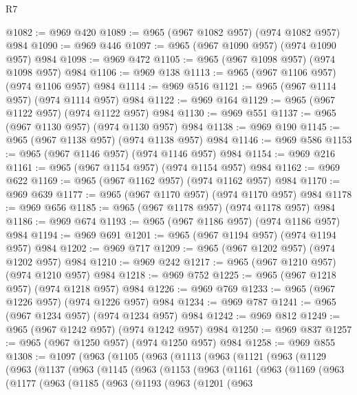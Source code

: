 \begin{lexlean}{R7}
\begin{coremodule}
@1082 := @969 @420
@1089 := @965 (@967 @1082 @957) (@974 @1082 @957) @984
@1090 := @969 @446
@1097 := @965 (@967 @1090 @957) (@974 @1090 @957) @984
@1098 := @969 @472
@1105 := @965 (@967 @1098 @957) (@974 @1098 @957) @984
@1106 := @969 @138
@1113 := @965 (@967 @1106 @957) (@974 @1106 @957) @984
@1114 := @969 @516
@1121 := @965 (@967 @1114 @957) (@974 @1114 @957) @984
@1122 := @969 @164
@1129 := @965 (@967 @1122 @957) (@974 @1122 @957) @984
@1130 := @969 @551
@1137 := @965 (@967 @1130 @957) (@974 @1130 @957) @984
@1138 := @969 @190
@1145 := @965 (@967 @1138 @957) (@974 @1138 @957) @984
@1146 := @969 @586
@1153 := @965 (@967 @1146 @957) (@974 @1146 @957) @984
@1154 := @969 @216
@1161 := @965 (@967 @1154 @957) (@974 @1154 @957) @984
@1162 := @969 @622
@1169 := @965 (@967 @1162 @957) (@974 @1162 @957) @984
@1170 := @969 @639
@1177 := @965 (@967 @1170 @957) (@974 @1170 @957) @984
@1178 := @969 @656
@1185 := @965 (@967 @1178 @957) (@974 @1178 @957) @984
@1186 := @969 @674
@1193 := @965 (@967 @1186 @957) (@974 @1186 @957) @984
@1194 := @969 @691
@1201 := @965 (@967 @1194 @957) (@974 @1194 @957) @984
@1202 := @969 @717
@1209 := @965 (@967 @1202 @957) (@974 @1202 @957) @984
@1210 := @969 @242
@1217 := @965 (@967 @1210 @957) (@974 @1210 @957) @984
@1218 := @969 @752
@1225 := @965 (@967 @1218 @957) (@974 @1218 @957) @984
@1226 := @969 @769
@1233 := @965 (@967 @1226 @957) (@974 @1226 @957) @984
@1234 := @969 @787
@1241 := @965 (@967 @1234 @957) (@974 @1234 @957) @984
@1242 := @969 @812
@1249 := @965 (@967 @1242 @957) (@974 @1242 @957) @984
@1250 := @969 @837
@1257 := @965 (@967 @1250 @957) (@974 @1250 @957) @984
@1258 := @969 @855
@1308 := @1097
    (@963
      (@1105
        (@963
          (@1113
            (@963
              (@1121
                (@963
                  (@1129
                    (@963
                      (@1137
                        (@963
                          (@1145
                            (@963
                              (@1153
                                (@963
                                  (@1161
                                    (@963
                                      (@1169
                                        (@963
                                          (@1177
                                            (@963
                                              (@1185
                                                (@963
                                                  (@1193
                                                    (@963
                                                      (@1201
                                                        (@963

\end{coremodule}
\end{lexlean}
